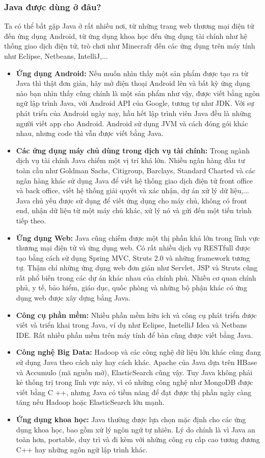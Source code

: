 \subsubsection{Java được dùng ở đâu?}

Ta có thể bắt gặp Java ở rất nhiều nơi, từ những trang web thương mại điện tử đến ứng dụng Android, từ ứng dụng khoa học đến ứng dụng tài chính như hệ thống giao dịch điện tử, trò chơi như Minecrafr đến các ứng dụng trên máy tính như Eclipse, Netbeans, IntelliJ,...
\begin{itemize}
    \item \textbf{Ứng dụng Android:} Nếu muốn nhìn thấy một sản phẩm được tạo ra từ Java thì thật đơn giản, hãy mở điện thoại Android lên và bất kỳ ứng dụng nào bạn nhìn thấy cũng chính là một sản phẩm như vậy, được viết bằng ngôn ngữ lập trình Java, với Android API của Google, tương tự như JDK. Với sự phát triển của Android ngày nay, hầu hết lập trình viên Java đều là những người viết app cho Android. Android sử dụng JVM và cách đóng gói khác nhau, nhưng code thì vẫn được viết bằng Java.
    \item \textbf{Các ứng dụng máy chủ dùng trong dịch vụ tài chính:} Trong ngành dịch vụ tài chính Java chiếm một vị trí khá lớn. Nhiều ngân hàng đầu tư toàn cầu như Goldman Sachs, Citigroup, Barclays, Standard Charted và các ngân hàng khác sử dụng Java để viết hệ thống giao dịch điện tử front office và back office, viết hệ thống giải quyết và xác nhận, dự án xử lý dữ liệu,... Java chủ yếu được sử dụng để viết ứng dụng cho máy chủ, không có front end, nhận dữ liệu từ một máy chủ khác, xử lý nó và gửi đến một tiến trình tiếp theo.
    \item \textbf{Ứng dụng Web:} Java cũng chiếm được một thị phần khá lớn trong lĩnh vực thương mại điện tử và ứng dụng web. Có rất nhiều dịch vụ RESTfull được tạo bằng cách sử dụng Spring MVC, Struts 2.0 và những framework tương tự. Thậm chí những ứng dụng web đơn giản như Servlet, JSP và Struts cũng rất phổ biến trong các dự án khác nhau của chính phủ. Nhiều cơ quan chính phủ, y tế, bảo hiểm, giáo dục, quốc phòng và những bộ phận khác có ứng dụng web được xây dựng bằng Java.
    \item \textbf{Công cụ phần mềm:} Nhiều phần mềm hữu ích và công cụ phát triển được viết và triển khai trong Java, ví dụ như Eclipse, InetelliJ Idea và Netbans IDE. Rất nhiều phần mềm trên máy tính để bàn cũng được viết bằng Java. 
    \item \textbf{Công nghệ Big Data:} Hadoop và các công nghệ dữ liệu lớn khác cũng đang sử dụng Java theo cách này hay cách khác. Apache của Java dựa trên HBase và Accumulo (mã nguồn mở), ElasticSearch cũng vậy. Tuy Java không phải kẻ thống trị trong lĩnh vực này, vì có những công nghệ như MongoDB được viết bằng C ++, nhưng Java có tiềm năng để đạt được thị phần ngày càng tăng nếu Hadoop hoặc ElasticSearch lớn mạnh.
    \item \textbf{Ứng dụng khoa học:} Java thường được lựa chọn mặc định cho các ứng dụng khoa học, bao gồm xử lý ngôn ngữ tự nhiên. Lý do chính là vì Java an toàn hơn, portable, duy trì và đi kèm với những công cụ cấp cao tương đương C++ hay những ngôn ngữ lập trình khác.
\end{itemize}

